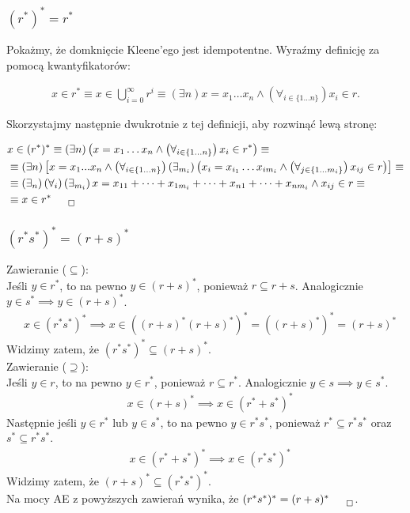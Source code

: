 \documentclass[12pt]{article}
\begin{document}
\subsubsection{$(r^{*})^{*} = r^{*}$}

Pokażmy, że domknięcie Kleene'ego jest idempotentne. Wyraźmy definicję za pomocą kwantyfikatorów:

\begin{align}
    x\in r^{*} \equiv x\in \bigcup_{i=0}^{\infty} r^i \equiv \left(\exists n\right) x=x_1\dots x_n \land \left(\forall_{i\in \{1\dots n\}}\right) x_i \in r.
\end{align}

\noindent
Skorzystajmy następnie dwukrotnie z tej definicji, aby rozwinąć lewą stronę:

\begin{align}
    &x\in (r^{*})^{*} \equiv \left(\exists n\right)\left(x=x_1\dots x_n \land \left(\forall_{i\in \{1\dots n\}}\right) x_i \in r^{*}\right) \equiv\\
    &\equiv \left(\exists n\right)\left[x=x_1...x_n \land \left(\forall_{i\in \{1\dots n\}}\right) \left(\exists_{m_i}\right) \left(x_i = x_{i_1}\dots x_{im_i} \land \left(\forall_{j\in \{1\dots m_i\}}\right) x_{ij} \in r\right)\right] \equiv\\
    &\equiv \left(\exists_n\right)\left(\forall_i\right)\left(\exists_{m_i}\right) x=x_{11}+\dots+x_{1m_i}+\dots+x_{n1} + \dots + x_{nm_i} \land x_{ij} \in r \equiv\\
    &\equiv x\in r^{*}_{\qed}
\end{align}

\subsubsection{$(r^{*}s^{*})^{*} = (r+s)^{*}$}

Zawieranie ($\subseteq$):\\
\noindent
Jeśli $y\in r^{*}$, to na pewno $y\in (r+s)^{*}$, ponieważ $r \subseteq r+s$. Analogicznie $y\in s^{*} \implies y\in (r+s)^{*}$.
\begin{align}
    &x\in (r^{*}s^{*})^{*} \implies x\in ((r+s)^{*}(r+s)^{*})^{*} = ((r+s)^{*})^{*} = (r+s)^{*}
\end{align}
Widzimy zatem, że $(r^{*}s^{*})^{*} \subseteq (r+s)^{*}$.\\

\noindent
Zawieranie ($\supseteq$):\\
\noindent
Jeśli $y\in r$, to na pewno $y\in r^{*}$, ponieważ $r \subseteq r^{*}$. Analogicznie $y\in s \implies y\in s^{*}$.
\begin{align}
    &x\in (r+s)^{*} \implies x\in (r^{*}+s^{*})^{*}
\end{align}
Następnie jeśli $y\in r^{*}$ lub $y\in s^{*}$, to na pewno $y\in r^{*}s^{*}$, ponieważ $r^{*} \subseteq r^{*}s^{*}$ oraz $s^{*} \subseteq r^{*}s^{*}$.
\begin{align}
    &x\in (r^{*}+s^{*})^{*} \implies x\in (r^{*}s^{*})^{*}
\end{align}
Widzimy zatem, że $(r+s)^{*} \subseteq (r^{*}s^{*})^{*}$.\\

\noindent
Na mocy AE z powyższych zawierań wynika, że $(r^{*}s^{*})^{*} = (r+s)^{*}_{\qed}$.
\end{document}
